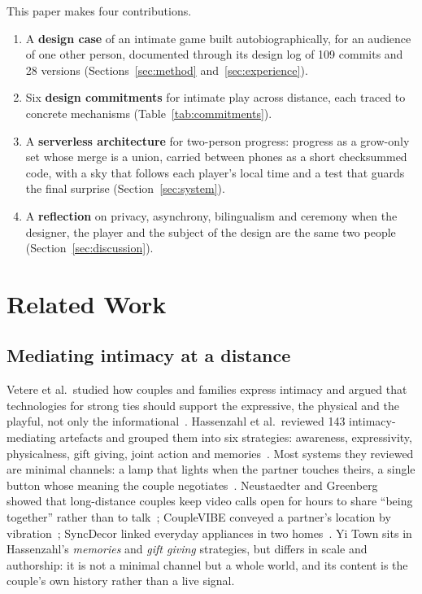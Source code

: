 \documentclass[sigconf,nonacm]{acmart}
\newcommand{\yt}{Yi Town}
\begin{document}
This paper makes four contributions.
\begin{enumerate}[leftmargin=*,itemsep=1pt,topsep=2pt]
  \item A \textbf{design case} of an intimate game built autobiographically, for an audience of
  one other person, documented through its design log of 109 commits and 28 versions
  (Sections~\ref{sec:method} and~\ref{sec:experience}).
  \item Six \textbf{design commitments} for intimate play across distance, each traced to concrete
  mechanisms (Table~\ref{tab:commitments}).
  \item A \textbf{serverless architecture} for two-person progress: progress as a grow-only set
  whose merge is a union, carried between phones as a short checksummed code, with a sky that
  follows each player's local time and a test that guards the final surprise (Section~\ref{sec:system}).
  \item A \textbf{reflection} on privacy, asynchrony, bilingualism and ceremony when the designer,
  the player and the subject of the design are the same two people (Section~\ref{sec:discussion}).
\end{enumerate}

\section{Related Work}

\subsection{Mediating intimacy at a distance}
Vetere et al.\ studied how couples and families express intimacy and argued that technologies for
strong ties should support the expressive, the physical and the playful, not only the
informational~\cite{vetere2005mediating}. Hassenzahl et al.\ reviewed 143 intimacy-mediating
artefacts and grouped them into six strategies: awareness, expressivity, physicalness, gift
giving, joint action and memories~\cite{hassenzahl2012love}. Most systems they reviewed are
minimal channels: a lamp that lights when the partner touches theirs, a single button
whose meaning the couple negotiates~\cite{kaye2006clicked}. Neustaedter and Greenberg showed
that long-distance couples keep video calls open for hours to share ``being together'' rather
than to talk~\cite{neustaedter2012intimacy}; CoupleVIBE conveyed a partner's location by
vibration~\cite{bales2011couplevibe}; SyncDecor linked everyday appliances in two
homes~\cite{tsujita2008syncdecor}. \yt{} sits in Hassenzahl's \emph{memories} and \emph{gift giving}
strategies, but differs in scale and authorship: it is not a minimal channel but a whole world,
and its content is the couple's own history rather than a live signal.
\end{document}
